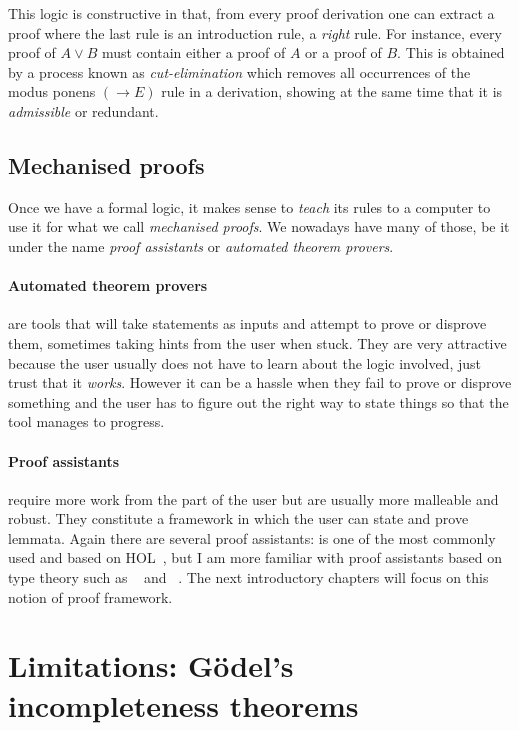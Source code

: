 This logic is constructive in that, from every proof derivation one can extract
a proof where the last rule is an introduction rule, \ie a \emph{right} rule.
For instance, every proof of \(A \vee B\) must contain either a proof of \(A\)
or a proof of \(B\).
This is obtained by a process known as \emph{cut-elimination} which removes all
occurrences of the modus ponens \((\to E)\) rule in a derivation, showing at the
same time that it is \emph{admissible} or redundant.

\subsection{Mechanised proofs}

Once we have a formal logic, it makes sense to \emph{teach} its rules to a
computer to use it for what we call \emph{mechanised proofs}.
We nowadays have many of those, be it under the name \emph{proof assistants} or
\emph{automated theorem provers}.

\paragraph{Automated theorem provers} are tools that will take statements as
inputs and attempt to prove or disprove them, sometimes taking hints from the
user when stuck.
They are very attractive because the user usually does not have to learn about
the logic involved, just trust that it \emph{works}. However it can be a hassle when they fail to prove or disprove
something and the user has to figure out the right way to state things so that
the tool manages to progress.

\paragraph{Proof assistants} require more work from the part of the user but are
usually more malleable and robust. They constitute a framework in which the user
can state and prove lemmata. Again there are several proof assistants: \IsaHOL
is one of the most commonly used and based on
\acrfull{HOL}~, but I am more  familiar with
proof assistants based on type theory such as \Coq~ and
\Agda~.
The next introductory chapters will focus on this notion of proof framework.

\section{Limitations: Gödel's incompleteness theorems}

